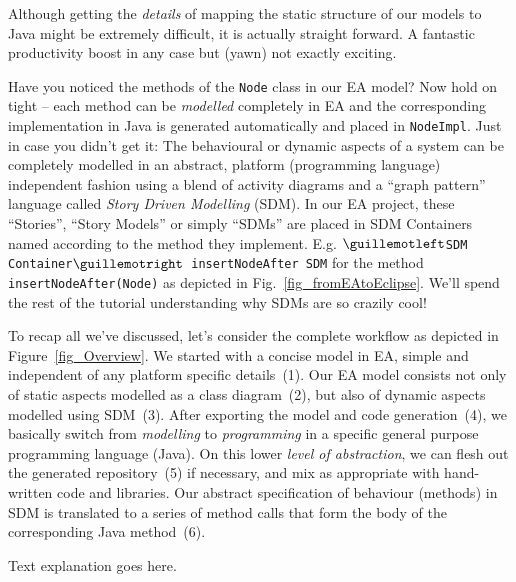 \begin{enumerate}
Although getting the \emph{details} of mapping the static structure of our models to Java might be extremely difficult, it is actually straight forward.  
A fantastic productivity boost in any case but (yawn) not exactly exciting.

Have you noticed the methods of the \texttt{Node} class in our EA model? 
Now hold on tight -- each method can be \emph{modelled} completely in EA and the corresponding implementation in Java is generated automatically and placed in \texttt{NodeImpl}.  
Just in case you didn't get it: The behavioural or dynamic aspects of a system can be completely modelled in an abstract, platform (programming language) independent fashion using a blend of activity  diagrams and a ``graph pattern'' language called \textit{Story Driven Modelling} (SDM).  
In our EA project, these ``Stories'', ``Story Models'' or simply ``SDMs'' are  placed in SDM Containers named according to the method they implement.  
E.g.  \texttt{$\guillemotleft$SDM Container$\guillemotright$ insertNodeAfter SDM} for the method  \texttt{insertNodeAfter(Node)} as depicted in
Fig.~\ref{fig_fromEAtoEclipse}.  
We'll spend the rest of the tutorial understanding why SDMs are so  {\huge crazily} cool!
 
To recap all we've discussed, let's consider the complete workflow as depicted in Figure~\ref{fig_Overview}. 
We started with a concise model in EA, simple and independent of any platform specific details~(1).  
Our EA model consists not only of static aspects modelled as a class diagram~(2), but also of dynamic
aspects modelled using SDM~(3).  After exporting the model and code generation~(4), we basically switch from \emph{modelling} to \emph{programming} in a specific general purpose programming language (Java).  
On this lower \emph{level of abstraction}, we can flesh out the generated repository~(5) if necessary, and mix as appropriate with hand-written code and libraries.  Our abstract specification of behaviour (methods) in SDM is translated to a series of method calls that form the body of the corresponding Java method~(6).

\newpage
\texHeader
Text explanation goes here.
\pagebreak

\visHeader


\end{enumerate}
